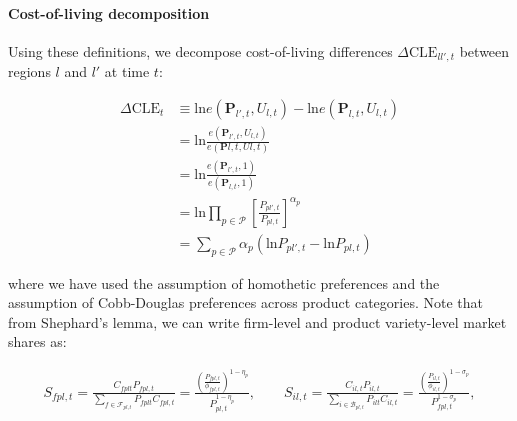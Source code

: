 \paragraph{Cost-of-living decomposition} Using these definitions, we decompose cost-of-living differences $\Delta \text{CLE}_{ll',t}$ between regions $l$ and $l'$ at time $t$: 
\begin{linenomath*}    
\begin{equation*}
    \begin{aligned}
    \Delta \text{CLE}_t 
        &\equiv \text{ln}e(\boldsymbol{P}_{l',t},U_{l,t}) - \text{ln}e(\boldsymbol{P}_{l,t},U_{l,t}) \\
        &= \text{ln}\frac{e(\boldsymbol{P}_{l',t},U_{l,t})}{e(\boldsymbol{P}{l,t},U{l,t})} \\
        &= \text{ln}\frac{e(\boldsymbol{P}_{l',t},1)}{e(\boldsymbol{P}_{l,t},1)} \\
        &= \text{ln}\prod_{p \in \mathcal{P}}\left[\frac{P_{pl',t}}{P_{pl,t}}\right]^{\alpha_p} \\
        &= \sum_{p \in \mathcal{P}} \alpha_p (\text{ln} P_{pl',t} - \text{ln} P_{pl,t}) 
    \end{aligned}
\end{equation*}
\end{linenomath*}    

\noindent where we have used the assumption of homothetic preferences and the assumption of Cobb-Douglas preferences across product categories. Note that from Shephard's lemma, we can write firm-level and product variety-level market shares as:
\begin{linenomath*}
    \begin{equation*}
        \begin{aligned}
        S_{fpl,t}    
            = \frac{C_{fplt}P_{fpl,t}}{\sum_{f \in \mathcal{F}_{pl,t}} P_{fplt}C_{fpl,t}}  
            = \frac{\left(\frac{P_{fpl,t}}{\phi_{fpl,t}}\right)^{1-\eta_p}}{P_{pl,t}^{1-\eta_p}},
        \qquad 
        S_{il,t}    
            = \frac{C_{il,t}P_{il,t}}{\sum_{i \in \mathcal{B}_{pl,t}} P_{ilt}C_{il,t}}  
            = \frac{\left(\frac{P_{il,t}}{\phi_{il,t}}\right)^{1-\sigma_p}}{P_{fpl,t}^{1-\sigma_p}},
        \end{aligned}
    \end{equation*}   
\end{linenomath*} 

